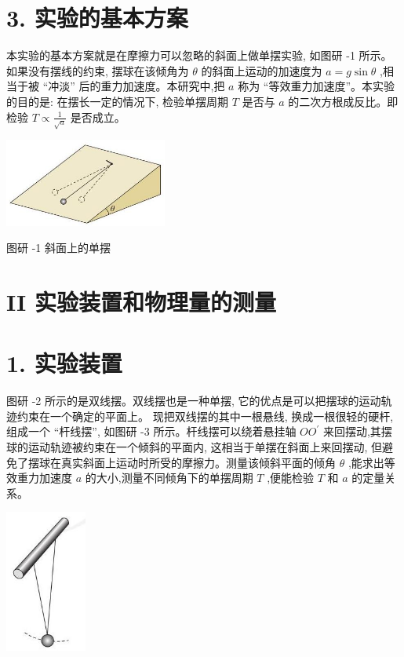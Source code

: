 \documentclass[10pt]{article}
\begin{document}
\section*{3. 实验的基本方案}

本实验的基本方案就是在摩擦力可以忽略的斜面上做单摆实验, 如图研 -1 所示。如果没有摆线的约束, 摆球在该倾角为 \(\theta\) 的斜面上运动的加速度为 \(a = g\sin \theta\) ,相当于被 “冲淡” 后的重力加速度。本研究中,把 \(a\) 称为 “等效重力加速度”。本实验的目的是: 在摆长一定的情况下, 检验单摆周期 \(T\) 是否与 \(a\) 的二次方根成反比。即检验 \(T \propto \frac{1}{\sqrt{a}}\) 是否成立。

\begin{center}
\includegraphics[max width=0.4\textwidth]{images/01910e4c-ebb8-7d2c-8f2f-2375bc1d2d12_122_960585.jpg}
\end{center}

图研 -1 斜面上的单摆

\section*{II 实验装置和物理量的测量}

\section*{1. 实验装置}

图研 -2 所示的是双线摆。双线摆也是一种单摆, 它的优点是可以把摆球的运动轨迹约束在一个确定的平面上。 现把双线摆的其中一根悬线, 换成一根很轻的硬杆, 组成一个 “杆线摆”, 如图研 -3 所示。杆线摆可以绕着悬挂轴 \(O{O}^{\prime }\) 来回摆动,其摆球的运动轨迹被约束在一个倾斜的平面内, 这相当于单摆在斜面上来回摆动, 但避免了摆球在真实斜面上运动时所受的摩擦力。测量该倾斜平面的倾角 \(\theta\) ,能求出等效重力加速度 \(a\) 的大小,测量不同倾角下的单摆周期 \(T\) ,便能检验 \(T\) 和 \(a\) 的定量关系。

\begin{center}
\includegraphics[max width=0.2\textwidth]{images/01910e4c-ebb8-7d2c-8f2f-2375bc1d2d12_122_859096.jpg}
\end{center}
\end{document}
